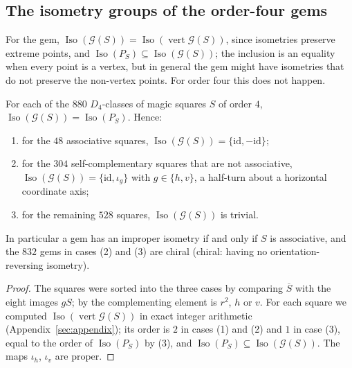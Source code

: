 \subsection{The isometry groups of the order-four gems}
\label{sec:iso4}

For the gem, $\operatorname{Iso}(\mathcal G(S))=\operatorname{Iso}(\operatorname{vert}\mathcal G(S))$, since isometries preserve extreme points, and $\operatorname{Iso}(P_S)\subseteq\operatorname{Iso}(\mathcal G(S))$; the inclusion is an equality when every point is a vertex, but in general the gem might have isometries that do not preserve the non-vertex points.
For order four this does not happen.

\begin{proposition}
\label{prop:iso4}
For each of the $880$ $D_4$-classes of magic squares $S$ of order $4$, $\operatorname{Iso}(\mathcal G(S))=\operatorname{Iso}(P_S)$. Hence:
\begin{enumerate}
\item for the $48$ associative squares, $\operatorname{Iso}(\mathcal G(S))=\{\mathrm{id},-\mathrm{id}\}$;
\item for the $304$ self-complementary squares that are not associative, $\operatorname{Iso}(\mathcal G(S))=\{\mathrm{id},\iota_g\}$ with $g\in\{h,v\}$, a half-turn about a horizontal coordinate axis;
\item for the remaining $528$ squares, $\operatorname{Iso}(\mathcal G(S))$ is trivial.
\end{enumerate}
In particular a gem has an improper isometry if and only if $S$ is associative, and the $832$ gems in cases (2) and (3) are chiral (chiral: having no orientation-reversing isometry).
\end{proposition}

\begin{proof}
The squares were sorted into the three cases by comparing $\overline S$ with the eight images $gS$; by  the complementing element is $r^2$, $h$ or $v$.
For each square we computed $\operatorname{Iso}(\operatorname{vert}\mathcal G(S))$ in exact integer arithmetic (Appendix~\ref{sec:appendix}); its order is $2$ in cases (1) and (2) and $1$ in case (3), equal to the order of $\operatorname{Iso}(P_S)$ by (3), and $\operatorname{Iso}(P_S)\subseteq\operatorname{Iso}(\mathcal G(S))$.
The maps $\iota_h$, $\iota_v$ are proper.
\end{proof}

